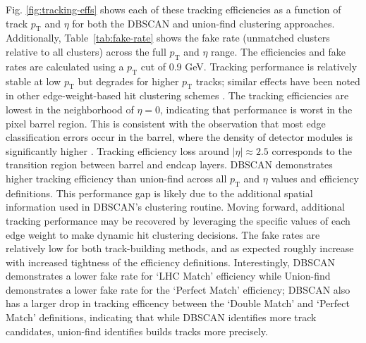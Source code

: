 \documentclass[twocolumn]{svjour3}
\newcommand{\pt}{\ensuremath{p_{\mathrm{T}}}\xspace}
\begin{document}
Fig. \ref{fig:tracking-effs} shows each of these tracking efficiencies as a function of track $\pt$ and $\eta$ for both the DBSCAN and union-find clustering approaches. 
Additionally, Table~\ref{tab:fake-rate} shows the fake rate (unmatched clusters relative to all clusters) across the full $\pt$ and $\eta$ range. The efficiencies and fake rates are calculated using a $\pt$ cut of 0.9 GeV.
Tracking performance is relatively stable at low $\pt$ but degrades for higher $\pt$ tracks; similar effects have been noted in other edge-weight-based hit clustering schemes \cite{Biscarat:2021dlj}. 
The tracking efficiencies are lowest in the neighborhood of $\eta=0$, indicating that performance is worst in the pixel barrel region.
This is consistent with the observation that most edge classification errors occur in the barrel, where the density of detector modules is significantly higher \cite{TrackML}. 
Tracking efficiency loss around $|\eta|\approx 2.5$ corresponds to the transition region between barrel and endcap layers. 
DBSCAN demonstrates higher tracking efficiency than union-find across all $\pt$ and $\eta$ values and efficiency definitions. 
This performance gap is likely due to the additional spatial information used in DBSCAN's clustering routine. 
Moving forward, additional tracking performance may be recovered by leveraging the specific values of each edge weight to make dynamic hit clustering decisions. The fake rates are relatively low for both track-building methods, and as expected roughly increase with increased tightness of the efficiency definitions. Interestingly, DBSCAN demonstrates a lower fake rate for `LHC Match' efficiency while Union-find demonstrates a lower fake rate for the `Perfect Match' efficiency; DBSCAN also has a larger drop in tracking efficency between the `Double Match' and `Perfect Match' definitions, indicating that while DBSCAN identifies more track candidates, union-find identifies builds tracks more precisely. 
\end{document}
